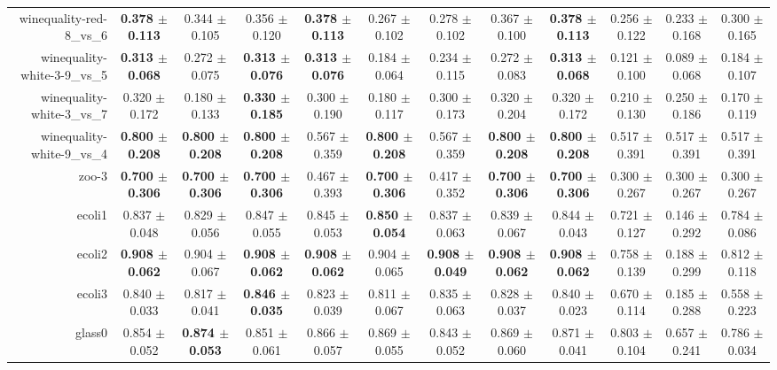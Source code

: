 \begin{table}[!ht]
{\begin{tabular}{r c c c c c c c c c c c}
winequality-red-8\_vs\_6 & \textbf{0.378 $\pm$ 0.113} & 0.344 $\pm$ 0.105 & 0.356 $\pm$ 0.120 & \textbf{0.378 $\pm$ 0.113} & 0.267 $\pm$ 0.102 & 0.278 $\pm$ 0.102 & 0.367 $\pm$ 0.100 & \textbf{0.378 $\pm$ 0.113} & 0.256 $\pm$ 0.122 & 0.233 $\pm$ 0.168 & 0.300 $\pm$ 0.165 \\
winequality-white-3-9\_vs\_5 & \textbf{0.313 $\pm$ 0.068} & 0.272 $\pm$ 0.075 & \textbf{0.313 $\pm$ 0.076} & \textbf{0.313 $\pm$ 0.076} & 0.184 $\pm$ 0.064 & 0.234 $\pm$ 0.115 & 0.272 $\pm$ 0.083 & \textbf{0.313 $\pm$ 0.068} & 0.121 $\pm$ 0.100 & 0.089 $\pm$ 0.068 & 0.184 $\pm$ 0.107 \\
winequality-white-3\_vs\_7 & 0.320 $\pm$ 0.172 & 0.180 $\pm$ 0.133 & \textbf{0.330 $\pm$ 0.185} & 0.300 $\pm$ 0.190 & 0.180 $\pm$ 0.117 & 0.300 $\pm$ 0.173 & 0.320 $\pm$ 0.204 & 0.320 $\pm$ 0.172 & 0.210 $\pm$ 0.130 & 0.250 $\pm$ 0.186 & 0.170 $\pm$ 0.119 \\
winequality-white-9\_vs\_4 & \textbf{0.800 $\pm$ 0.208} & \textbf{0.800 $\pm$ 0.208} & \textbf{0.800 $\pm$ 0.208} & 0.567 $\pm$ 0.359 & \textbf{0.800 $\pm$ 0.208} & 0.567 $\pm$ 0.359 & \textbf{0.800 $\pm$ 0.208} & \textbf{0.800 $\pm$ 0.208} & 0.517 $\pm$ 0.391 & 0.517 $\pm$ 0.391 & 0.517 $\pm$ 0.391 \\
zoo-3 & \textbf{0.700 $\pm$ 0.306} & \textbf{0.700 $\pm$ 0.306} & \textbf{0.700 $\pm$ 0.306} & 0.467 $\pm$ 0.393 & \textbf{0.700 $\pm$ 0.306} & 0.417 $\pm$ 0.352 & \textbf{0.700 $\pm$ 0.306} & \textbf{0.700 $\pm$ 0.306} & 0.300 $\pm$ 0.267 & 0.300 $\pm$ 0.267 & 0.300 $\pm$ 0.267 \\
ecoli1 & 0.837 $\pm$ 0.048 & 0.829 $\pm$ 0.056 & 0.847 $\pm$ 0.055 & 0.845 $\pm$ 0.053 & \textbf{0.850 $\pm$ 0.054} & 0.837 $\pm$ 0.063 & 0.839 $\pm$ 0.067 & 0.844 $\pm$ 0.043 & 0.721 $\pm$ 0.127 & 0.146 $\pm$ 0.292 & 0.784 $\pm$ 0.086 \\
ecoli2 & \textbf{0.908 $\pm$ 0.062} & 0.904 $\pm$ 0.067 & \textbf{0.908 $\pm$ 0.062} & \textbf{0.908 $\pm$ 0.062} & 0.904 $\pm$ 0.065 & \textbf{0.908 $\pm$ 0.049} & \textbf{0.908 $\pm$ 0.062} & \textbf{0.908 $\pm$ 0.062} & 0.758 $\pm$ 0.139 & 0.188 $\pm$ 0.299 & 0.812 $\pm$ 0.118 \\
ecoli3 & 0.840 $\pm$ 0.033 & 0.817 $\pm$ 0.041 & \textbf{0.846 $\pm$ 0.035} & 0.823 $\pm$ 0.039 & 0.811 $\pm$ 0.067 & 0.835 $\pm$ 0.063 & 0.828 $\pm$ 0.037 & 0.840 $\pm$ 0.023 & 0.670 $\pm$ 0.114 & 0.185 $\pm$ 0.288 & 0.558 $\pm$ 0.223 \\
glass0 & 0.854 $\pm$ 0.052 & \textbf{0.874 $\pm$ 0.053} & 0.851 $\pm$ 0.061 & 0.866 $\pm$ 0.057 & 0.869 $\pm$ 0.055 & 0.843 $\pm$ 0.052 & 0.869 $\pm$ 0.060 & 0.871 $\pm$ 0.041 & 0.803 $\pm$ 0.104 & 0.657 $\pm$ 0.241 & 0.786 $\pm$ 0.034 \\

\end{tabular}}
\end{table}
